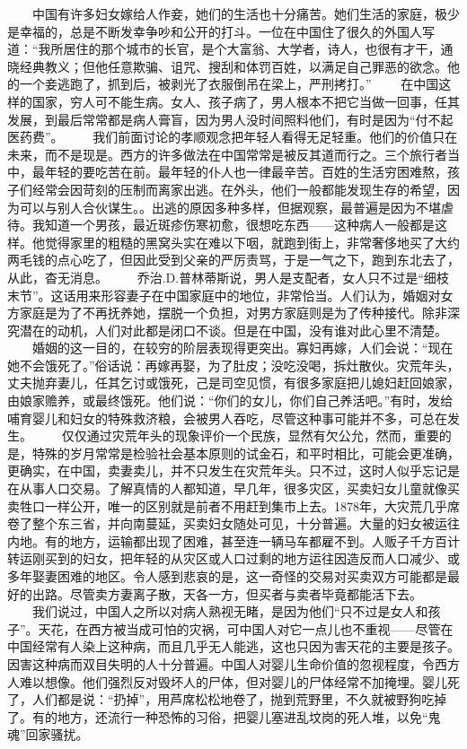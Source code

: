 \documentclass[12pt,oneside]{book}
\begin{document}
\begin{common-format}
　　中国有许多妇女嫁给人作妾，她们的生活也十分痛苦。她们生活的家庭，极少是幸福的，总是不断发幸争吵和公开的打斗。一位在中国住了很久的外国人写道：“我所居住的那个城市的长官，是个大富翁、大学者，诗人，也很有才干，通晓经典教义；但他任意欺骗、诅咒、搜刮和体罚百姓，以满足自己罪恶的欲念。他的一个妾逃跑了，抓到后，被剥光了衣服倒吊在梁上，严刑拷打。” 
　　在中国这样的国家，穷人可不能生病。女人、孩子病了，男人根本不把它当做一回事，任其发展，到最后常常都是病人膏盲，因为男人没时间照料他们，有时是因为“付不起医药费”。 
　　我们前面讨论的孝顺观念把年轻人看得无足轻重。他们的价值只在未来，而不是现是。西方的许多做法在中国常常是被反其道而行之。三个旅行者当中，最年轻的要吃苦在前。最年轻的仆人也一律最辛苦。百姓的生活穷困难熬，孩子们经常会因苛刻的压制而离家出逃。在外头，他们一般都能发现生存的希望，因为可以与别人合伙谋生。。出逃的原因多种多样，但据观察，最普遍是因为不堪虐待。我知道一个男孩，最近斑疹伤寒初愈，很想吃东西——这种病人一般都是这样。他觉得家里的粗糙的黑窝头实在难以下咽，就跑到街上，非常奢侈地买了大约两毛钱的点心吃了，但因此受到父亲的严厉责骂，于是一气之下，跑到东北去了，从此，杳无消息。 
　　乔治.D.普林蒂斯说，男人是支配者，女人只不过是“细枝末节”。这话用来形容妻子在中国家庭中的地位，非常恰当。人们认为，婚姻对女方家庭是为了不再抚养她，摆脱一个负担，对男方家庭则是为了传种接代。除非深究潜在的动机，人们对此都是闭口不谈。但是在中国，没有谁对此心里不清楚。 
　　婚姻的这一目的，在较穷的阶层表现得更突出。寡妇再嫁，人们会说：“现在她不会饿死了。”俗话说：再嫁再娶，为了肚皮；没吃没喝，拆灶散伙。灾荒年头，丈夫抛弃妻儿，任其乞讨或饿死，己是司空见惯，有很多家庭把儿媳妇赶回娘家，由娘家赡养，或最终饿死。他们说：“你们的女儿，你们自己养活吧。”有时，发给哺育婴儿和妇女的特殊救济粮，会被男人吞吃，尽管这种事可能并不多，可总在发生。 
　　仅仅通过灾荒年头的现象评价一个民族，显然有欠公允，然而，重要的是，特殊的岁月常常是检验社会基本原则的试金石，和平时相比，可能会更准确，更确实，在中国，卖妻卖儿，并不只发生在灾荒年头。只不过，这时人似乎忘记是在从事人口交易。了解真情的人都知道，早几年，很多灾区，买卖妇女儿童就像买卖牲口一样公开，唯一的区别就是前者不用赶到集市上去。1878年，大灾荒几乎席卷了整个东三省，并向南蔓延，买卖妇女随处可见，十分普遍。大量的妇女被运往内地。有的地方，运输都出现了困难，甚至连一辆马车都雇不到。人贩子千方百计转运刚买到的妇女，把年轻的从灾区或人口过剩的地方运往因造反而人口减少、或多年娶妻困难的地区。令人感到悲哀的是，这一奇怪的交易对买卖双方可能都是最好的出路。尽管卖方妻离子散，天各一方，但买者与卖者毕竟都能活下去。 
　　我们说过，中国人之所以对病人熟视无睹，是因为他们“只不过是女人和孩子”。天花，在西方被当成可怕的灾祸，可中国人对它一点儿也不重视——尽管在中国经常有人染上这种病，而且几乎无人能逃，这也只因为害天花的主要是孩子。因害这种病而双目失明的人十分普遍。中国人对婴儿生命价值的忽视程度，令西方人难以想像。他们强烈反对毁坏人的尸体，但对婴儿的尸体经常不加掩埋。婴儿死了，人们都是说：“扔掉”，用芦席松松地卷了，抛到荒野里，不久就被野狗吃掉了。有的地方，还流行一种恐怖的习俗，把婴儿塞进乱坟岗的死人堆，以免“鬼魂”回家骚扰。 

\end{common-format}
\end{document}
